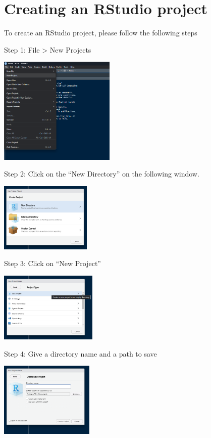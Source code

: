 \documentclass[
  letterpaper,
  DIV=11,
  numbers=noendperiod]{scrreprt}
\begin{document}
\section{Creating an RStudio project}\label{creating-an-rstudio-project}

To create an RStudio project, please follow the following steps

Step 1: File \textgreater{} New Projects

\includegraphics[width=2.18in,height=\textheight,keepaspectratio]{img/chap1/rw8.png}

Step 2: Click on the ``New Directory'' on the following window.

\includegraphics[width=1.71in,height=\textheight,keepaspectratio]{img/chap1/rw9.png}

Step 3: Click on ``New Project''

\includegraphics[width=1.82in,height=\textheight,keepaspectratio]{img/chap1/rw10.png}

Step 4: Give a directory name and a path to save

\includegraphics[width=1.76in,height=\textheight,keepaspectratio]{img/chap1/rw11.png}
\end{document}
